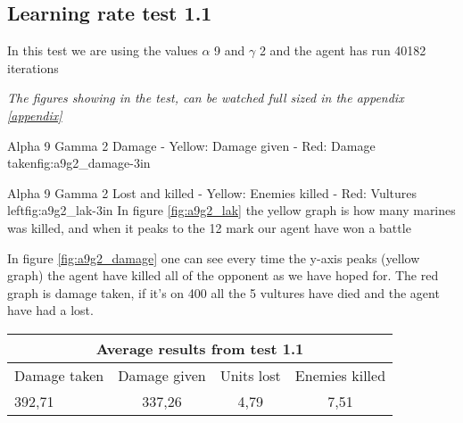 \subsection*{Learning rate test 1.1}
In this test we are using the values $\alpha$ 9 and $\gamma$ 2 and the agent has run 40182 iterations


\textit{The figures showing in the test, can be watched full sized in the appendix \ref{appendix}} 

			{Alpha 9 Gamma 2 Damage - Yellow: Damage given - Red: Damage taken}{fig:a9g2_damage}{-3in}

			{Alpha 9 Gamma 2 Lost and killed - Yellow: Enemies killed - Red: Vultures left}{fig:a9g2_lak}{-3in}
In figure \ref{fig:a9g2_lak} the yellow graph is how many marines was killed, and when it peaks to the 12 mark our agent have won a battle




In figure \ref{fig:a9g2_damage} one can see every time the y-axis peaks (yellow graph) the agent have killed all of the opponent as we have hoped for. The red graph is damage taken, if it's on 400 all the 5 vultures have died and the agent have had a lost.

\begin{centering}
 \begin{tabular}{|l||c|c|c|}
	\multicolumn{4}{c}{Average results from test 1.1} \\
	\hline
		Damage taken & Damage given & Units lost & Enemies killed\\
	\hline
		392,71 & 337,26 & 4,79 & 7,51 \\
	\hline
\end{tabular}
\end{centering}

